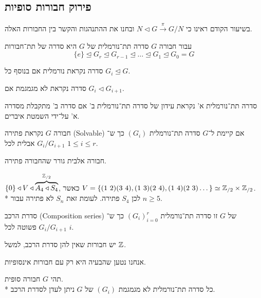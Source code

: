 \subsection{פירוק חבורות סופיות}
בשיעור הקודם ראינו כי $N \triangleleft G \xrightarrow{\pi} G / N$ ובחנו את ההתנהגות והקשר בין החבורות האלה.
\begin{definition}
	עבור חבורה $G$ סדרה תת־נורמלית של $G$ היא סדרה של תת־חבורות
	\[
		\{e\} \trianglelefteq G_r \trianglelefteq G_{r - 1} \trianglelefteq \dots \trianglelefteq G_1 \trianglelefteq G_0 = G
	\]
\end{definition}
\begin{remark}
	סדרה נקראת נורמלית אם בנוסף כל $G_i \trianglelefteq G$.
\end{remark}
\begin{remark}
	סדרה נקראת לא מגמגמת אם $G_i \triangleleft G_{i + 1}$.
\end{remark}
\begin{remark}
	סדרה תת־נורמלית א' נקראת עידון של סדרה תת־נורמלית ב' אם סדרה ב' מתקבלת מסדרה א' על־ידי השמטת איברים.
\end{remark}
\begin{definition}
	חבורה $G$ נקראת פתירה (Solvable) אם קיימת ל־$G$ סדרה תת־נורמלית $(G_i)$ כך ש־$G_i / G_{i + 1}$ אבלית לכל $1 \le i \le r$.
\end{definition}
חבורה אלבית גורר שהחבורה פתירה.
\begin{example}
	$\{0\} \triangleleft V \triangleleft \overbrace{A_4 \triangleleft S_4}^{\mathbb{Z}_{/2}}$, כאשר $V = \{ (1\ 2)(3\ 4), (1\ 3)(2\ 4), (1\ 4)(2\ 3) \dots \} \simeq \mathbb{Z}_{/2} \times \mathbb{Z}_{/2}$. \\*
	לכן $S_4$ פתירה. לעומת זאת $S_n$ לא פתירה עבור $n \ge 5$.
\end{example}
\begin{definition}
	סדרת הרכב (Composition series) של $G$ זו סדרה תת־נורמלית ${(G_i)}_{i = 0}^r$ כך ש־$G_i / G_{i + 1}$ פשוטה לכל $i$.
\end{definition}
\begin{remark}
	יש חבורות שאין להן סדרת הרכב, למשל $\mathbb{Z}$.
\end{remark}
אנחנו נטען שהבעיה היא רק עם חבורות אינסופיות.
\begin{proposition}
	תהי $G$ חבורה סופית. \\*
	כל סדרה תת־נורמלית לא מגמגמת $(G_i)$ של $G$ ניתן לעדן לסדרת הרכב.
\end{proposition}
